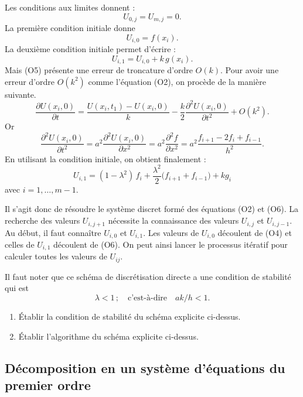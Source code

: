 Les conditions aux limites donnent :
\begin{equation}
  U_{0,j} = U_{m,j} = 0 .
  \tag{O3}
\end{equation}
La première condition initiale donne
\begin{equation}
  U_{i,0} = f(x_i) .
  \tag{O4}
\end{equation}
La deuxième condition initiale permet d'écrire :
\begin{equation}
  U_{i,1} = U_{i,0} + k\,g(x_i) .
  \tag{O5}
\end{equation}
Mais (O5) présente une erreur de troncature d'ordre $O(k)$. Pour avoir une
erreur d'ordre $O(k^2)$ comme l'équation (O2), on procède de la manière
suivante.
\[
  \frac{\partial U(x_i, 0)}{\partial t}
  = \frac{U(x_i, t_1) - U(x_i, 0)}{k}
  - \frac{k}{2}\frac{\partial^2 U(x_i, 0)}{\partial t^2} + O(k^2) .
\]
Or
\[
  \frac{\partial^2 U(x_i, 0)}{\partial t^2}
  = a^2\frac{\partial^2 U(x_i, 0)}{\partial x^2}
  = a^2\frac{\partial^2 f}{\partial x^2}
  = a^2\frac{f_{i+1} - 2f_i + f_{i-1}}{h^2} .
\]
En utilisant la condition initiale, on obtient finalement :
\begin{equation}
  U_{i,1} = (1 - \lambda^2)\,f_i + \frac{\lambda^2}{2}\bigl(f_{i+1} + f_{i-1}\bigr) + kg_i
  \tag{O6}
\end{equation}
avec $i = 1, \dots, m-1$.

Il s'agit donc de résoudre le système discret formé des équations (O2) et
(O6). La recherche des valeurs $U_{i,j+1}$ nécessite la connaissance des
valeurs $U_{i,j}$ et $U_{i,j-1}$. Au début, il faut connaître $U_{i,0}$ et
$U_{i,1}$. Les valeurs de $U_{i,0}$ découlent de (O4) et celles de $U_{i,1}$
découlent de (O6). On peut ainsi lancer le processus itératif pour calculer
toutes les valeurs de $U_{ij}$.

Il faut noter que ce schéma de discrétisation directe a une condition de
stabilité qui est
\[
  \lambda < 1 \,; \quad\text{c'est-à-dire}\quad ak/h < 1 .
\]

\begin{exercice}
\begin{enumerate}[label=\alph*-]
  \item Établir la condition de stabilité du schéma explicite ci-dessus.
  \item Établir l'algorithme du schéma explicite ci-dessus.
\end{enumerate}
\end{exercice}

\subsection{Décomposition en un système d'équations du premier ordre}

